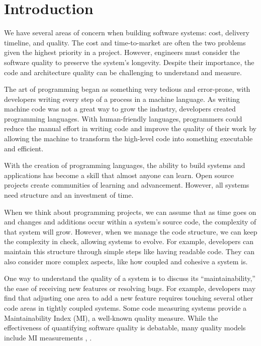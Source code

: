\chapter{Introduction} \label{sectionIntroduction}

We have several areas of concern when building software systems: cost, delivery timeline, and quality. The cost and time-to-market are often the two problems given the highest priority in a project. However, engineers must consider the software quality to preserve the system's longevity. Despite their importance, the code and architecture quality can be challenging to understand and measure.

The art of programming began as something very tedious and error-prone, with developers writing every step of a process in a machine language. As writing machine code was not a great way to grow the industry, developers created programming languages. With human-friendly languages, programmers could reduce the manual effort in writing code and improve the quality of their work by allowing the machine to transform the high-level code into something executable and efficient. \cite{lehman:1980}

With the creation of programming languages, the ability to build systems and applications has become a skill that almost anyone can learn. Open source projects create communities of learning and advancement. However, all systems need structure and an investment of time.

When we think about programming projects, we can assume that as time goes on and changes and additions occur within a system's source code, the complexity of that system will grow. However, when we manage the code structure, we can keep the complexity in check, allowing systems to evolve. For example, developers can maintain this structure through simple steps like having readable code. They can also consider more complex aspects, like how coupled and cohesive a system is.

One way to understand the quality of a system is to discuss its ``maintainability,'' the ease of receiving new features or resolving bugs. For example, developers may find that adjusting one area to add a new feature requires touching several other code areas in tightly coupled systems. Some code measuring systems provide a Maintainability Index (MI), a well-known quality measure. While the effectiveness of quantifying software quality is debatable, many quality models include MI measurements \cite{vandeursen:2014}, \cite{adewumi:2016}. 

